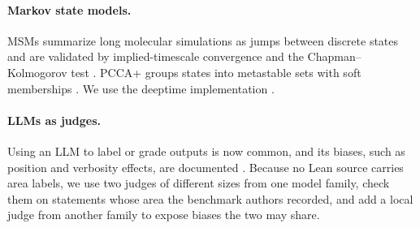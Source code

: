 \paragraph{Markov state models.}
MSMs summarize long molecular simulations as jumps between discrete states
and are validated by implied-timescale convergence and the
Chapman--Kolmogorov test \citep{prinz2011markov,husic2018markov}. PCCA+
groups states into metastable sets with soft memberships
\citep{deuflhard2005pcca,roblitz2013fuzzy}. We use the deeptime
implementation \citep{hoffmann2022deeptime}.

\paragraph{LLMs as judges.}
Using an LLM to label or grade outputs is now common, and its biases, such
as position and verbosity effects, are documented \citep{zheng2023judging}.
Because no Lean source carries area labels, we use two judges of different
sizes from one model family, check them on statements whose area the
benchmark authors recorded, and add a local judge from another family to
expose biases the two may share.
